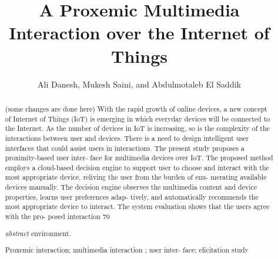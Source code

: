 \documentclass[runningheads,a4paper]{llncs}
\newcommand{\keywords}[1]{\par\addvspace\baselineskip
\noindent\keywordname\enspace\ignorespaces#1}
\begin{document}
\mainmatter  %

\title{A Proxemic Multimedia Interaction over the Internet of Things}


%
%
\author{Ali Danesh, Mukesh Saini, and Abdulmotaleb El Saddik }






%
%

\maketitle


\begin{abstract}
(some changes are done here)
With the rapid growth of online devices, a new concept of Internet of Things (IoT) is emerging in which everyday devices will be connected to the Internet. As the number of devices in IoT is increasing, so is the complexity of the interactions between user and devices. There is a need to design intelligent user interfaces that could assist users in interactions. The present study proposes a proximity-based user inter- face for multimedia devices over IoT. The proposed method employs a cloud-based decision engine to support user to choose and interact with the most appropriate device, reliving the user from the burden of enu- merating available devices manually. The decision engine observes the multimedia content and device properties, learns user preferences adap- tively, and automatically recommends the most appropriate device to interact. The system evaluation shows that the users agree with the pro- posed interaction 70%

\emph{abstract} environment.
\keywords{Proxemic interaction; multimedia interaction ; user inter- face; elicitation study 
}
\end{abstract}
\end{document}
